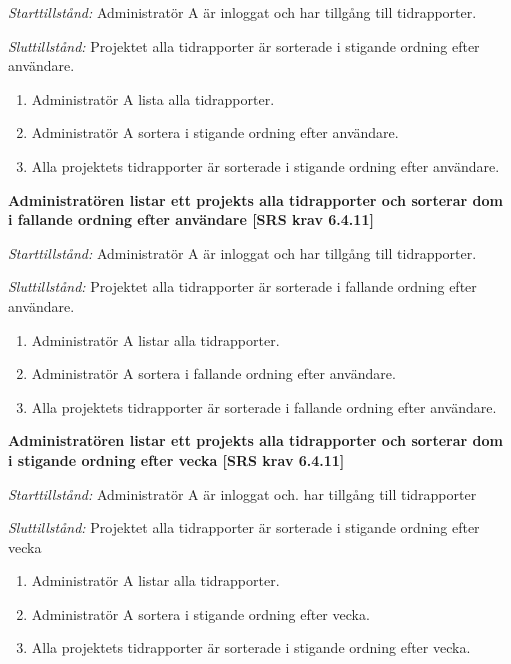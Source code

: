 \documentclass[a4paper]{article}
\begin{document}
\begin{FT}
\emph{Starttillstånd:} Administratör A är inloggat och har tillgång till tidrapporter.

\emph{Sluttillstånd:} Projektet alla tidrapporter är sorterade i stigande ordning efter användare.

\begin{enumerate}
\item Administratör A lista alla tidrapporter.
\item Administratör A sortera i stigande ordning efter användare.
\item Alla projektets tidrapporter är sorterade i stigande ordning efter användare.
\end{enumerate}

\item %
\textbf{Administratören listar ett projekts alla tidrapporter och sorterar dom i fallande ordning efter användare [SRS krav 6.4.11]}

\emph{Starttillstånd:} Administratör A är inloggat och har tillgång till tidrapporter.

\emph{Sluttillstånd:} Projektet alla tidrapporter är sorterade i fallande ordning efter användare.

\begin{enumerate}
\item Administratör A listar alla tidrapporter.
\item Administratör A sortera i fallande ordning efter användare.
\item Alla projektets tidrapporter är sorterade i fallande ordning efter användare.
\end{enumerate}

\item %
\textbf{Administratören listar ett projekts alla tidrapporter och sorterar dom i stigande ordning efter vecka [SRS krav 6.4.11]}

\emph{Starttillstånd:} Administratör A är inloggat och. har tillgång till tidrapporter

\emph{Sluttillstånd:} Projektet alla tidrapporter är sorterade i stigande ordning efter vecka

\begin{enumerate}
\item Administratör A listar alla tidrapporter.
\item Administratör A sortera i stigande ordning efter vecka.
\item Alla projektets tidrapporter är sorterade i stigande ordning efter vecka.
\end{enumerate}


\end{FT}
\end{document}
